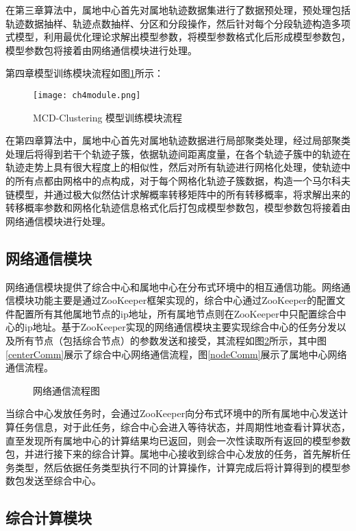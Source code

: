 在第三章算法中，属地中心首先对属地轨迹数据集进行了数据预处理，预处理包括轨迹数据抽样、轨迹点数抽样、分区和分段操作，然后针对每个分段轨迹构造多项式模型，利用最优化理论求解出模型参数，将模型参数格式化后形成模型参数包，模型参数包将接着由网络通信模块进行处理。

第四章模型训练模块流程如图\ref{ch4module}所示：
\begin{figure}[H]
	\texttt{[image: ch4module.png]}
	\caption{MCD-Clustering 模型训练模块流程}
	\label{ch4module}
\end{figure}

在第四章算法中，属地中心首先对属地轨迹数据进行局部聚类处理，经过局部聚类处理后将得到若干个轨迹子簇，依据轨迹间距离度量，在各个轨迹子簇中的轨迹在轨迹走势上具有很大程度上的相似性，然后对所有轨迹进行网格化处理，使轨迹中的所有点都由网格中的点构成，对于每个网格化轨迹子簇数据，构造一个马尔科夫链模型，并通过极大似然估计求解概率转移矩阵中的所有转移概率，将求解出来的转移概率参数和网格化轨迹信息格式化后打包成模型参数包，模型参数包将接着由网络通信模块进行处理。

\subsection{网络通信模块}

网络通信模块提供了综合中心和属地中心在分布式环境中的相互通信功能。网络通信模块功能主要是通过ZooKeeper框架实现的，综合中心通过ZooKeeper的配置文件配置所有其他属地节点的ip地址，所有属地节点则在ZooKeeper中只配置综合中心的ip地址。基于ZooKeeper实现的网络通信模块主要实现综合中心的任务分发以及所有节点（包括综合节点）的参数发送和接受，其流程如图\ref{comm}所示，其中图\ref{centerComm}展示了综合中心网络通信流程，图\ref{nodeComm}展示了属地中心网络通信流程。
\begin{figure}[H]
\caption{网络通信流程图}
\label{comm}
\end{figure}

当综合中心发放任务时，会通过ZooKeeper向分布式环境中的所有属地中心发送计算任务信息，对于此任务，综合中心会进入等待状态，并周期性地查看计算状态，直至发现所有属地中心的计算结果均已返回，则会一次性读取所有返回的模型参数包，并进行接下来的综合计算。属地中心接收到综合中心发放的任务，首先解析任务类型，然后依据任务类型执行不同的计算操作，计算完成后将计算得到的模型参数包发送至综合中心。

\subsection{综合计算模块}

